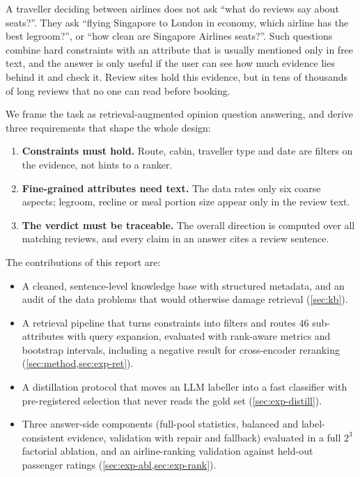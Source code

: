 \documentclass[10pt,twocolumn,a4paper]{article}
\begin{document}
A traveller deciding between airlines does not ask ``what do reviews say about seats?''. They ask ``flying Singapore
to London in economy, which airline has the best legroom?'', or ``how clean are Singapore Airlines seats?''. Such
questions combine hard constraints with an attribute that is usually mentioned only in free text, and the answer is
only useful if the user can see how much evidence lies behind it and check it. Review sites hold this evidence, but in
tens of thousands of long reviews that no one can read before booking.

We frame the task as retrieval-augmented opinion question answering, and derive three requirements that shape the
whole design:
\begin{enumerate}[label=\textbf{R\arabic*}]
  \item \textbf{Constraints must hold.} Route, cabin, traveller type and date are filters on the evidence, not hints to a ranker.
  \item \textbf{Fine-grained attributes need text.} The data rates only six coarse aspects; legroom, recline or meal portion size appear only in the review text.
  \item \textbf{The verdict must be traceable.} The overall direction is computed over all matching reviews, and every claim in an answer cites a review sentence.
\end{enumerate}

The contributions of this report are:
\begin{itemize}
  \item A cleaned, sentence-level knowledge base with structured metadata, and an audit of the data problems that would otherwise damage retrieval (\cref{sec:kb}).
  \item A retrieval pipeline that turns constraints into filters and routes 46 sub-attributes with query expansion, evaluated with rank-aware metrics and bootstrap intervals, including a negative result for cross-encoder reranking (\cref{sec:method,sec:exp-ret}).
  \item A distillation protocol that moves an LLM labeller into a fast classifier with pre-registered selection that never reads the gold set (\cref{sec:exp-distill}).
  \item Three answer-side components (full-pool statistics, balanced and label-consistent evidence, validation with repair and fallback) evaluated in a full $2^3$ factorial ablation, and an airline-ranking validation against held-out passenger ratings (\cref{sec:exp-abl,sec:exp-rank}).
\end{itemize}
\end{document}
